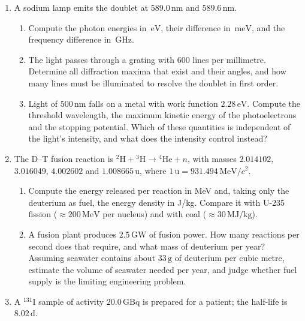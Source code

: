 \documentclass[11pt,a4paper]{article}
\newcommand{\unit}[1]{\,\mathrm{#1}}
\newenvironment{parts}{\begin{enumerate}[label=\textbf{\alph*)}]}{\end{enumerate}}
\begin{document}
\begin{parts}
\item A sodium lamp emits the doublet at $589.0\unit{nm}$ and
      $589.6\unit{nm}$.
      \begin{enumerate}[label=\roman*.]
      \item Compute the photon energies in $\unit{eV}$, their difference in
            $\unit{meV}$, and the frequency difference in $\unit{GHz}$.
      \item The light passes through a grating with $600$ lines per
            millimetre. Determine all diffraction maxima that exist and their
            angles, and how many lines must be illuminated to resolve the
            doublet in first order.
      \item Light of $500\unit{nm}$ falls on a metal with work function
            $2.28\unit{eV}$. Compute the threshold wavelength, the maximum
            kinetic energy of the photoelectrons and the stopping potential.
            Which of these quantities is independent of the light's intensity,
            and what does the intensity control instead?
      \end{enumerate}
\item The D--T fusion reaction is
      ${}^{2}\mathrm{H}+{}^{3}\mathrm{H}\to{}^{4}\mathrm{He}+n$, with masses
      $2.014102$, $3.016049$, $4.002602$ and $1.008665\unit{u}$, where
      $1\unit{u}=931.494\unit{MeV}/c^2$.
      \begin{enumerate}[label=\roman*.]
      \item Compute the energy released per reaction in MeV and, taking only
            the deuterium as fuel, the energy density in J/kg. Compare it
            with U-235 fission ($\approx200\unit{MeV}$ per nucleus) and with
            coal ($\approx30\unit{MJ/kg}$).
      \item A fusion plant produces $2.5\unit{GW}$ of fusion power. How many
            reactions per second does that require, and what mass of
            deuterium per year? Assuming seawater contains about
            $33\unit{g}$ of deuterium per cubic metre, estimate the volume of
            seawater needed per year, and judge whether fuel supply is the
            limiting engineering problem.
      \end{enumerate}
\item A ${}^{131}\mathrm{I}$ sample of activity $20.0\unit{GBq}$ is prepared
      for a patient; the half-life is $8.02\unit{d}$.
      \begin{enumerate}[label=\roman*.]

\end{enumerate}
\end{parts}
\end{document}
